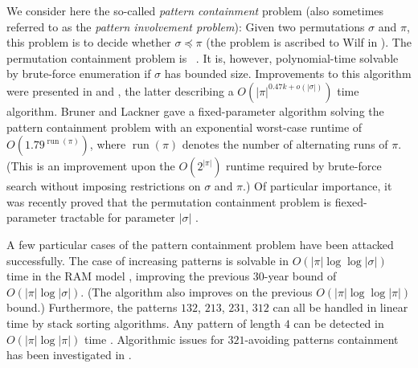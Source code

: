 \documentclass[a4paper]{llncs}
\DeclareMathOperator{\RUN}{run}
\newcounter{num}
\begin{document}
	We consider here the so-called \emph{pattern containment} problem
	(also sometimes referred to as the \emph{pattern involvement problem}):
	Given two permutations $\sigma$ and $\pi$, this problem is to decide whether
	$\sigma \preceq \pi$ (the problem is ascribed to Wilf in \cite{Bose:Buss:Lubiw:1998}).
	The permutation containment problem is \NPhard~\cite{Bose:Buss:Lubiw:1998}.
	It is, however, polynomial-time solvable by brute-force enumeration
	if $\sigma$ has bounded size.
	Improvements to this algorithm were presented in
	\cite{Albert:Aldred:Atkinson:Holton:ISAAC:2001} and
	\cite{Ahal:Rabinovich:2008},
	the latter describing a $O(|\pi|^{0.47k+o(|\sigma| )})$ time algorithm.
	Bruner and Lackner \cite{Bruner:Lackner:SWAT:2012}
	gave a fixed-parameter algorithm solving the pattern containment problem with
	an exponential worst-case runtime of $O(1.79^{\RUN(\pi)})$,
	where $\RUN(\pi)$ denotes the number of alternating runs of $\pi$.
	(This is an improvement upon the $O(2^{|\pi|})$ runtime required by
	brute-force search without imposing restrictions on $\sigma$ and $\pi$.)
	Of particular importance, it was recently proved that
	the permutation containment problem is fiexed-parameter tractable for
	parameter $|\sigma|$
	\cite{Guillemot:Marx:SODA:2014}.

	A few particular cases of the pattern containment problem have been attacked successfully.
	The case of increasing patterns is solvable in
	$O(|\pi| \log \log |\sigma|)$ time in the RAM model \cite{Crochemore:Porat:2010},
	improving the previous 30-year bound of $O(|\pi| \log |\sigma|)$.
	(The algorithm also improves on the previous
	$O(|\pi| \log \log |\pi|)$ bound.)
	Furthermore, the patterns $132$, $213$, $231$, $312$ can all be handled in linear time
	by stack sorting algorithms.
	Any pattern of length $4$ can be detected in $O(|\pi| \log |\pi|)$ time
	\cite{Albert:Aldred:Atkinson:Holton:ISAAC:2001}.
	Algorithmic issues for $321$-avoiding patterns containment has been investigated in
	\cite{Guillemot:Vialette:ISAAC:2009}.
\end{document}
